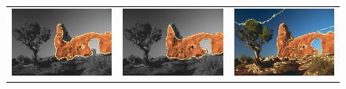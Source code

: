 \documentclass[runningheads]{llncs}
\begin{document}
\begin{figure}
\begin{tabular}{ccc}
		\includegraphics[scale=0.2]{images/segmentation/bc/rock/gc-seg.png} &
		\includegraphics[scale=0.2]{images/segmentation/bc/rock/corrected-seg.png} &					\includegraphics[scale=0.2]{images/segmentation/schoenemann/rock/rock-seg.png}\\

\end{tabular}
\end{figure}
\end{document}
